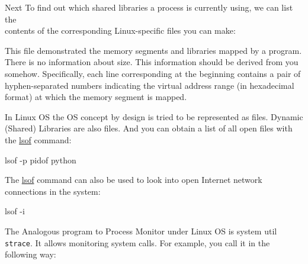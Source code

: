 \documentclass[
]{article}
\newenvironment{Shaded}{}{}
\newcommand{\AttributeTok}[1]{\textcolor[rgb]{0.49,0.56,0.16}{#1}}
\newcommand{\ExtensionTok}[1]{#1}
\newcommand{\FunctionTok}[1]{\textcolor[rgb]{0.02,0.16,0.49}{#1}}
\newcommand{\KeywordTok}[1]{\textcolor[rgb]{0.00,0.44,0.13}{\textbf{#1}}}
\newcommand{\NormalTok}[1]{#1}
\newcommand{\VariableTok}[1]{\textcolor[rgb]{0.10,0.09,0.49}{#1}}
\begin{document}
\begin{Shaded}
\end{Shaded}

Next To find out which shared libraries a process is currently using, we
can list the\\
contents of the corresponding Linux-specific files you can make:

\begin{Shaded}
\end{Shaded}

This file demonstrated the memory segments and libraries mapped by a
program. There is no information about size. This information should be
derived from you somehow. Specifically, each line corresponding at the
beginning contains a pair of hyphen-separated numbers indicating the
virtual address range (in hexadecimal format) at which the memory
segment is mapped.

In Linux OS the OS concept by design is tried to be represented as
files. Dynamic (Shared) Libraries are also files. And you can obtain a
list of all open files with the
\href{https://linux.die.net/man/8/lsof}{lsof} command:

\begin{Shaded}
\begin{Highlighting}[]
\ExtensionTok{lsof} \AttributeTok{{-}p} \KeywordTok{\textasciigrave{}}\FunctionTok{pidof}\NormalTok{ python}\KeywordTok{\textasciigrave{}}
\end{Highlighting}
\end{Shaded}

The \href{https://linux.die.net/man/8/lsof}{lsof} command can also be
used to look into open Internet network connections in the system:

\begin{Shaded}
\begin{Highlighting}[]
\ExtensionTok{lsof} \AttributeTok{{-}i}
\end{Highlighting}
\end{Shaded}

The Analogous program to Process Monitor under Linux OS is system util
\texttt{strace}. It allows monitoring system calls. For example, you
call it in the following way:
\end{document}
